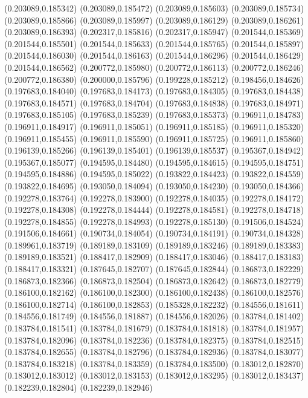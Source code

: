 (0.203089,0.185342)
(0.203089,0.185472)
(0.203089,0.185603)
(0.203089,0.185734)
(0.203089,0.185866)
(0.203089,0.185997)
(0.203089,0.186129)
(0.203089,0.186261)
(0.203089,0.186393)
(0.202317,0.185816)
(0.202317,0.185947)
(0.201544,0.185369)
(0.201544,0.185501)
(0.201544,0.185633)
(0.201544,0.185765)
(0.201544,0.185897)
(0.201544,0.186030)
(0.201544,0.186163)
(0.201544,0.186296)
(0.201544,0.186429)
(0.201544,0.186562)
(0.200772,0.185980)
(0.200772,0.186113)
(0.200772,0.186246)
(0.200772,0.186380)
(0.200000,0.185796)
(0.199228,0.185212)
(0.198456,0.184626)
(0.197683,0.184040)
(0.197683,0.184173)
(0.197683,0.184305)
(0.197683,0.184438)
(0.197683,0.184571)
(0.197683,0.184704)
(0.197683,0.184838)
(0.197683,0.184971)
(0.197683,0.185105)
(0.197683,0.185239)
(0.197683,0.185373)
(0.196911,0.184783)
(0.196911,0.184917)
(0.196911,0.185051)
(0.196911,0.185185)
(0.196911,0.185320)
(0.196911,0.185455)
(0.196911,0.185590)
(0.196911,0.185725)
(0.196911,0.185860)
(0.196139,0.185266)
(0.196139,0.185401)
(0.196139,0.185537)
(0.195367,0.184942)
(0.195367,0.185077)
(0.194595,0.184480)
(0.194595,0.184615)
(0.194595,0.184751)
(0.194595,0.184886)
(0.194595,0.185022)
(0.193822,0.184423)
(0.193822,0.184559)
(0.193822,0.184695)
(0.193050,0.184094)
(0.193050,0.184230)
(0.193050,0.184366)
(0.192278,0.183764)
(0.192278,0.183900)
(0.192278,0.184035)
(0.192278,0.184172)
(0.192278,0.184308)
(0.192278,0.184444)
(0.192278,0.184581)
(0.192278,0.184718)
(0.192278,0.184855)
(0.192278,0.184993)
(0.192278,0.185130)
(0.191506,0.184524)
(0.191506,0.184661)
(0.190734,0.184054)
(0.190734,0.184191)
(0.190734,0.184328)
(0.189961,0.183719)
(0.189189,0.183109)
(0.189189,0.183246)
(0.189189,0.183383)
(0.189189,0.183521)
(0.188417,0.182909)
(0.188417,0.183046)
(0.188417,0.183183)
(0.188417,0.183321)
(0.187645,0.182707)
(0.187645,0.182844)
(0.186873,0.182229)
(0.186873,0.182366)
(0.186873,0.182504)
(0.186873,0.182642)
(0.186873,0.182779)
(0.186100,0.182162)
(0.186100,0.182300)
(0.186100,0.182438)
(0.186100,0.182576)
(0.186100,0.182714)
(0.186100,0.182853)
(0.185328,0.182232)
(0.184556,0.181611)
(0.184556,0.181749)
(0.184556,0.181887)
(0.184556,0.182026)
(0.183784,0.181402)
(0.183784,0.181541)
(0.183784,0.181679)
(0.183784,0.181818)
(0.183784,0.181957)
(0.183784,0.182096)
(0.183784,0.182236)
(0.183784,0.182375)
(0.183784,0.182515)
(0.183784,0.182655)
(0.183784,0.182796)
(0.183784,0.182936)
(0.183784,0.183077)
(0.183784,0.183218)
(0.183784,0.183359)
(0.183784,0.183500)
(0.183012,0.182870)
(0.183012,0.183012)
(0.183012,0.183153)
(0.183012,0.183295)
(0.183012,0.183437)
(0.182239,0.182804)
(0.182239,0.182946)
